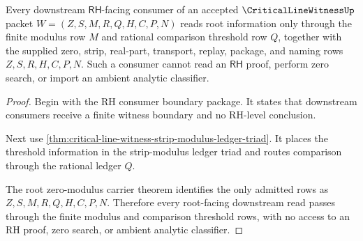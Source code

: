 \begin{theorem}
\label{thm:critical-line-witness-root-consumer-threshold}
Every downstream $\mathsf{RH}$-facing consumer of an accepted $\CriticalLineWitnessUp$ packet $W=(Z,S,M,R,Q,H,C,P,N)$ reads root information only through the finite modulus row $M$ and rational comparison threshold row $Q$, together with the supplied zero, strip, real-part, transport, replay, package, and naming rows $Z,S,R,H,C,P,N$. Such a consumer cannot read an $\mathsf{RH}$ proof, perform zero search, or import an ambient analytic classifier.
\end{theorem}
\begin{proof}
Begin with the RH consumer boundary package. It states that downstream consumers receive a finite witness boundary and no RH-level conclusion.

Next use \autoref{thm:critical-line-witness-strip-modulus-ledger-triad}. It places the threshold information in the strip-modulus ledger triad and routes comparison through the rational ledger $Q$.

The root zero-modulus carrier theorem identifies the only admitted rows as $Z,S,M,R,Q,H,C,P,N$. Therefore every root-facing downstream read passes through the finite modulus and comparison threshold rows, with no access to an RH proof, zero search, or ambient analytic classifier.
\end{proof}


